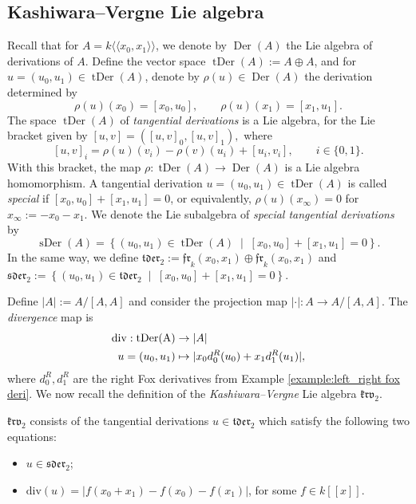 \documentclass[a4paper,fleqn]{cas-sc}
\begin{document}
\subsection{Kashiwara--Vergne Lie algebra}\label{subsection:kv}
Recall that for $A=k\langle\!\langle x_0,x_1\rangle\!\rangle$, we denote by $\operatorname{Der}(A)$ the Lie algebra of derivations of $A$. Define the vector space $\operatorname{tDer}(A):=A\oplus A$, and for $u=(u_0,u_1)\in\operatorname{tDer}(A)$, denote by $\rho(u)\in\operatorname{Der}(A)$
the derivation determined by
\[
\rho(u)(x_0)=[x_0,u_0],
\qquad
\rho(u)(x_1)=[x_1,u_1].
\]
%
The space $\operatorname{tDer}(A)$ of \textit{tangential derivations} is a Lie algebra, for the Lie bracket given by
$[u,v]=([u,v]_0,[u,v]_1),$ where
\[
[u,v]_i
=
\rho(u)(v_i)-\rho(v)(u_i)+[u_i,v_i],
\qquad i\in\{0,1\}.
\]
With this bracket, the map $\rho:\operatorname{tDer}(A)\to\operatorname{Der}(A)$ is a Lie algebra homomorphism. A tangential derivation
$u=(u_0,u_1)\in\operatorname{tDer}(A)$ is called \textit{special} if $[x_0,u_0]+[x_1,u_1]=0$, or equivalently, $\rho(u)(x_\infty)=0$ for $ x_\infty:=-x_0-x_1$. We denote the Lie subalgebra of \textit{special tangential derivations} by
\[
\operatorname{sDer}(A)
=
\left\{
(u_0,u_1)\in\operatorname{tDer}(A)
\;\middle|\;
[x_0,u_0]+[x_1,u_1]=0
\right\}.
\]
In the same way, we define
$\mathfrak{tder}_2:=\mathfrak{fr}_k(x_0,x_1)\oplus \mathfrak{fr}_k(x_0,x_1)$
and $\mathfrak{sder}_2:=
\left\{
(u_0,u_1)\in\mathfrak{tder}_2
\;\middle|\;
[x_0,u_0]+[x_1,u_1]=0
\right\}.$


Define $|A|:=A/[A,A]$ and consider the projection map $|\cdot|:A\to A/[A,A]$. The \emph{divergence} map is
\begin{align}
\label{eq:divergence}
\rm{div}: \rm{tDer}(A) & \to |A| \nonumber \\
u=(u_0,u_1) & \mapsto |x_0d^R_0(u_0)+x_1d^R_1(u_1)|,
\end{align}
where $d_0^R, d_1^R$ are the right Fox derivatives from Example \ref{example:left_right fox deri}. We now recall the definition of the \emph{Kashiwara--Vergne} Lie algebra $\mathfrak{krv}_2$.

\begin{definition} \label{def:krv} $\mathfrak{krv}_2$ consists of the tangential derivations $u\in  \mathfrak{tder}_2 $ which satisfy the following two equations:
\begin{itemize}[leftmargin=5em]
    \item[(krv1)] $u\in \mathfrak{sder}_2$;
    \item[(krv2)] $\text{div}(u)=|f(x_0+x_1)-f(x_0)-f(x_1)|$, for some $f\in k[[x]].$
\end{itemize}
\end{definition}
\end{document}

